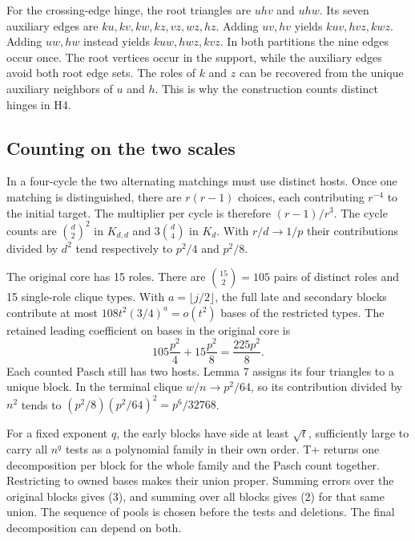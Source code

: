 \documentclass[english,11pt,a4paper]{article}
\begin{document}
For the crossing-edge hinge, the root triangles are \(uhv\) and \(uhw\). Its seven auxiliary edges are \(ku,kv,kw,kz,vz,wz,hz\). Adding \(uv,hv\) yields \(kuv,hvz,kwz\). Adding \(uw,hw\) instead yields \(kuw,hwz,kvz\). In both partitions the nine edges occur once. The root vertices occur in the support, while the auxiliary edges avoid both root edge sets. The roles of \(k\) and \(z\) can be recovered from the unique auxiliary neighbors of \(u\) and \(h\). This is why the construction counts distinct hinges in H4.

\subsection{Counting on the two scales}\label{counting-on-the-two-scales}

In a four-cycle the two alternating matchings must use distinct hosts. Once one matching is distinguished, there are \(r(r-1)\) choices, each contributing \(r^{-4}\) to the initial target. The multiplier per cycle is therefore \((r-1)/r^3\). The cycle counts are \(\binom d2^2\) in \(K_{d,d}\) and \(3\binom d4\) in \(K_d\). With \(r/d\to1/p\) their contributions divided by \(d^2\) tend respectively to \(p^2/4\) and \(p^2/8\).

The original core has 15 roles. There are \(\binom{15}{2}=105\) pairs of distinct roles and 15 single-role clique types. With \(a=\lfloor j/2\rfloor\), the full late and secondary blocks contribute at most \(108t^2(3/4)^a=o(t^2)\) bases of the restricted types. The retained leading coefficient on bases in the original core is \[105\frac{p^2}{4}+15\frac{p^2}{8}=\frac{225p^2}{8}.\] Each counted Pasch still has two hosts. Lemma 7 assigns its four triangles to a unique block. In the terminal clique \(w/n\to p^2/64\), so its contribution divided by \(n^2\) tends to \((p^2/8)(p^2/64)^2=p^6/32768\).

For a fixed exponent \(q\), the early blocks have side at least \(\sqrt t\), sufficiently large to carry all \(n^q\) tests as a polynomial family in their own order. T+ returns one decomposition per block for the whole family and the Pasch count together. Restricting to owned bases makes their union proper. Summing errors over the original blocks gives (3), and summing over all blocks gives (2) for that same union. The sequence of pools is chosen before the tests and deletions. The final decomposition can depend on both.
\end{document}
